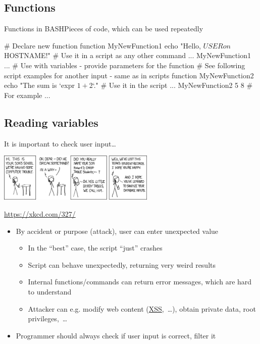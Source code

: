 \documentclass[compress, ucs, xelatex, 11pt, xcolor=svgnames,
  hyperref={
    bookmarks=true,
    unicode=true,
    colorlinks=true,
    pdftitle={Linux, command line and MetaCentrum},
    plainpages=false,
    pdfauthor={Vojtech Zeisek},
    pdfsubject={Course about use of Linux command line, writing shell scripts and using MetaCentrum of CESNET},
    pdfcreator={XeLaTeX},
    pdfkeywords={Linux, GNU, BASH, shell, command line, MetaCentrum},
    linkcolor=DarkRed,
    anchorcolor=DarkBlue,
    citecolor=Indigo,
    filecolor=NavyBlue,
    menucolor=DarkMagenta,
    urlcolor=DarkBlue,
    pdftex},
  url={hyphens, lowtilde} %
  ]{beamer}
\begin{document}
\subsection{Functions}

\begin{frame}[fragile]{Functions in BASH}{Pieces of code, which can be used repeatedly}
  \begin{bashcode}
    # Declare new function
    function MyNewFunction1 {
      echo "Hello, $USER on $HOSTNAME!"
      }
    # Use it in a script as any other command
    ...
    MyNewFunction1
    ...
    # Use with variables - provide parameters for the function
    # See following script examples for another input - same as in scripts
    function MyNewFunction2 {
      echo "The sum is `expr $1 + $2`."
      }
    # Use it in the script
    ...
    MyNewFunction2 5 8 # For example
    ...
  \end{bashcode}
\end{frame}

\subsection{Reading variables}

\begin{frame}{It is important to check user input\ldots}
  \begin{center}
    \includegraphics[width=7.5cm]{exploits_of_a_mom.png}
  \end{center}
  \begin{flushright}
    \url{https://xkcd.com/327/}
  \end{flushright}
  \begin{itemize}
    \item By accident or purpose (attack), user can enter unexpected value
    \begin{itemize}
      \item In the ``best'' case, the script ``just'' crashes
      \item Script can behave unexpectedly, returning very weird results
      \item Internal functions/commands can return error messages, which are hard to understand
      \item Attacker can e.g. modify web content (\href{https://en.wikipedia.org/wiki/Cross-site_scripting}{XSS},~\ldots), obtain private data, root privileges,~\ldots
    \end{itemize}
    \item Programmer should always check if user input is correct, filter it
  \end{itemize}
\end{frame}
\end{document}
